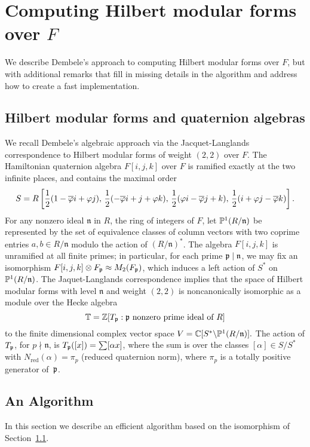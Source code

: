 \documentclass{amsart}
\newcommand{\n}{\mathfrak{n}}
\begin{document}
\section{Computing Hilbert modular forms over $F$}\label{sec:hmf}

We describe Dembele's approach to computing Hilbert modular forms over
$F$, but with additional remarks that fill in missing details in the
algorithm and address how to create a fast implementation.

\subsection{Hilbert modular forms and quaternion 
algebras}\label{sec:dembele}
We recall Dembele's algebraic approach
\cite{dembele:hilbert5} via the Jacquet-Langlands correspondence to
Hilbert modular forms of weight $(2,2)$ over $F$.
The Hamiltonian quaternion algebra $F[i,j,k]$ over $F$ is ramified
exactly at the two infinite places, and contains the maximal order
$$
 S = R\left[\frac{1}{2}(1-\overline{\varphi} i + \varphi j),\,
       \frac{1}{2}(-\overline{\varphi} i + j + \varphi k),\,
       \frac{1}{2}(\varphi i - \overline{\varphi} j + k), \,
       \frac{1}{2}(i + \varphi j - \overline{\varphi} k)\right].
$$
For any nonzero ideal $\n$ in $R$, the ring of integers of $F$,
let $\P^1(R/\n)$ be represented by the set of equivalence classes of
 column vectors with two coprime entries $a,b \in R/\n$ modulo the
 action of $(R/\n)^*$. The algebra $F[i,j,k]$ is unramified at all finite primes; in
particular, for each prime $\p\mid \n$, we may fix an isomorphism
$F[i,j,k]\otimes F_{\mathfrak{p}} \approx M_2(F_{\mathfrak{p}})$, which induces a left
action of $S^*$ on $\P^1(R/\n)$. The Jaquet-Langlands correspondence implies that
the space of Hilbert modular forms with level $\n$ and weight $(2,2)$ is
noncanonically isomorphic as a module over the Hecke algebra
$$\mathbb{T}=\mathbb{Z}[T_{\mathfrak{p}} :  \mathfrak{p} \text{ nonzero prime ideal of }R]$$ 
to the finite dimensional complex vector space $ V = \C[S^* \backslash
\P^1(R/\n)].  $ The action of $T_{\mathfrak{p}}$, for $p\nmid \n$, is
$T_{\mathfrak{p}}([x]) = \sum [\alpha x]$, where the sum is over the classes
$[\alpha]\in S/S^*$ with $N_{\text{red}}(\alpha)=\pi_p$ (reduced quaternion norm),
where $\pi_p$ is a totally positive generator of~$\mathfrak{p}$.

\subsection{An Algorithm}

In this section we describe an efficient algorithm based on
the isomorphism of Section~\ref{sec:dembele}.
\end{document}
